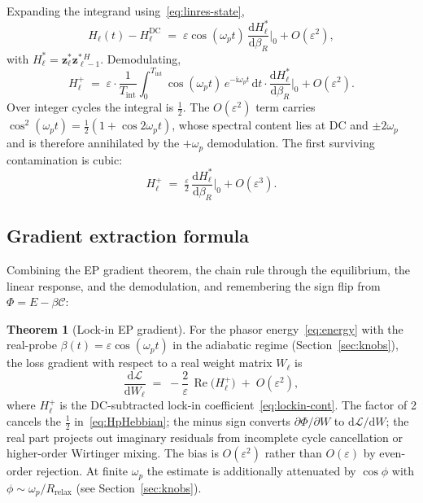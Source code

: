 \documentclass[11pt]{article}
\newcommand{\im}{\mathrm{i}}
\newcommand{\dd}{\mathrm{d}}
\theoremstyle{definition}
\newtheorem{theorem}{Theorem}
\DeclareMathOperator{\Real}{Re}
\begin{document}
Expanding the integrand using~\eqref{eq:linres-state},
\begin{equation}\label{eq:H-expand}
  H_\ell(t) - H_\ell^{\text{DC}}
  \;=\;
  \varepsilon\cos(\omega_p t)\,
  \frac{\dd H_\ell^*}{\dd\beta_R}\bigg|_0
  + O(\varepsilon^2),
\end{equation}
with $H_\ell^* = \bm{z}_\ell^*\bm{z}_{\ell-1}^{*\,H}$.  Demodulating,
\begin{equation}\label{eq:demod-step}
  H_\ell^{+}
  \;=\;
  \varepsilon\cdot\frac{1}{T_\text{int}}\!\int_0^{T_\text{int}}
  \cos(\omega_p t)\,e^{-\im\omega_p t}\,\dd t
  \cdot \frac{\dd H_\ell^*}{\dd\beta_R}\bigg|_0
  + O(\varepsilon^2).
\end{equation}
Over integer cycles the integral is $\tfrac{1}{2}$.  The $O(\varepsilon^2)$
term carries $\cos^2(\omega_p t) = \tfrac12(1 + \cos 2\omega_p t)$,
whose spectral content lies at DC and $\pm2\omega_p$ and is therefore
annihilated by the $+\omega_p$ demodulation.  The first surviving
contamination is cubic:
\begin{equation}\label{eq:HpHebbian}
  H_\ell^{+}
  \;=\;
  \tfrac{\varepsilon}{2}\,
  \frac{\dd H_\ell^*}{\dd\beta_R}\bigg|_0
  + O(\varepsilon^3).
\end{equation}

\subsection{Gradient extraction formula}
Combining the EP gradient theorem, the chain rule through the
equilibrium, the linear response, and the demodulation, and
remembering the sign flip from $\Phi = E - \beta\mathcal{C}$:

\begin{theorem}[Lock-in EP gradient]\label{thm:lockin-grad}
For the phasor energy~\eqref{eq:energy} with the real-probe
$\beta(t) = \varepsilon\cos(\omega_p t)$ in the adiabatic regime
(Section~\ref{sec:knobs}), the loss gradient with respect to a real
weight matrix $W_\ell$ is
\begin{equation}\label{eq:main-grad}
  \boxed{
  \frac{\dd\mathcal{L}}{\dd W_\ell}
  \;=\;
  -\frac{2}{\varepsilon}\,\Real\bigl(H_\ell^{+}\bigr)
  \;+\; O(\varepsilon^2),
  }
\end{equation}
where $H_\ell^{+}$ is the DC-subtracted lock-in coefficient~\eqref{eq:lockin-cont}.
The factor of 2 cancels the $\tfrac{1}{2}$ in~\eqref{eq:HpHebbian};
the minus sign converts $\partial\Phi/\partial W$ to $\dd\mathcal{L}/\dd W$;
the real part projects out imaginary residuals from incomplete cycle
cancellation or higher-order Wirtinger mixing.  The bias is
$O(\varepsilon^2)$ rather than $O(\varepsilon)$ by even-order rejection.
At finite $\omega_p$ the estimate is additionally attenuated by
$\cos\phi$ with $\phi\sim\omega_p/R_\text{relax}$ (see
Section~\ref{sec:knobs}).
\end{theorem}
\end{document}
